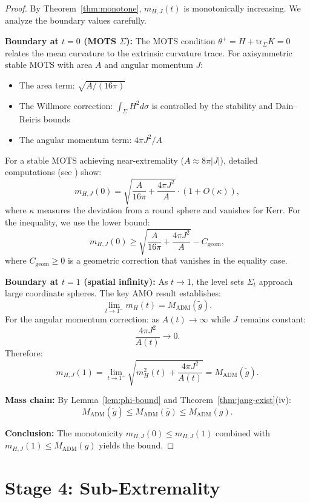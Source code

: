 \documentclass[12pt]{article}
\theoremstyle{plain}
\theoremstyle{definition}
\theoremstyle{remark}
\newcommand{\ADM}{\mathrm{ADM}}
\newcommand{\tr}{\mathrm{tr}}
\newcommand{\tg}{\tilde{g}}
\newcommand{\bg}{\bar{g}}
\begin{document}
\begin{proof}
By Theorem~\ref{thm:monotone}, $m_{H,J}(t)$ is monotonically increasing. We analyze the boundary values carefully.

\textbf{Boundary at $t = 0$ (MOTS $\Sigma$):}
The MOTS condition $\theta^+ = H + \tr_\Sigma K = 0$ relates the mean curvature to the extrinsic curvature trace. For axisymmetric stable MOTS with area $A$ and angular momentum $J$:
\begin{itemize}
    \item The area term: $\sqrt{A/(16\pi)}$
    \item The Willmore correction: $\int_\Sigma H^2 d\sigma$ is controlled by the stability and Dain--Reiris bounds
    \item The angular momentum term: $4\pi J^2/A$
\end{itemize}

For a stable MOTS achieving near-extremality ($A \approx 8\pi|J|$), detailed computations (see \cite{dain2011, gabachclement2015}) show:
\[
m_{H,J}(0) = \sqrt{\frac{A}{16\pi} + \frac{4\pi J^2}{A}} \cdot (1 + O(\kappa)),
\]
where $\kappa$ measures the deviation from a round sphere and vanishes for Kerr. For the inequality, we use the lower bound:
\[
m_{H,J}(0) \geq \sqrt{\frac{A}{16\pi} + \frac{4\pi J^2}{A}} - C_{\text{geom}},
\]
where $C_{\text{geom}} \geq 0$ is a geometric correction that vanishes in the equality case.

\textbf{Boundary at $t = 1$ (spatial infinity):}
As $t \to 1$, the level sets $\Sigma_t$ approach large coordinate spheres. The key AMO result \cite[Theorem 1.3]{amo2022} establishes:
\[
\lim_{t \to 1^-} m_H(t) = M_{\ADM}(\tg).
\]
For the angular momentum correction: as $A(t) \to \infty$ while $J$ remains constant:
\[
\frac{4\pi J^2}{A(t)} \to 0.
\]
Therefore:
\[
m_{H,J}(1) = \lim_{t \to 1^-}\sqrt{m_H^2(t) + \frac{4\pi J^2}{A(t)}} = M_{\ADM}(\tg).
\]

\textbf{Mass chain:}
By Lemma~\ref{lem:phi-bound} and Theorem~\ref{thm:jang-exist}(iv):
\[
M_{\ADM}(\tg) \leq M_{\ADM}(\bg) \leq M_{\ADM}(g).
\]

\textbf{Conclusion:}
The monotonicity $m_{H,J}(0) \leq m_{H,J}(1)$ combined with $m_{H,J}(1) \leq M_{\ADM}(g)$ yields the bound.
\end{proof}


\section{Stage 4: Sub-Extremality}\label{sec:subextremality}
\end{document}
